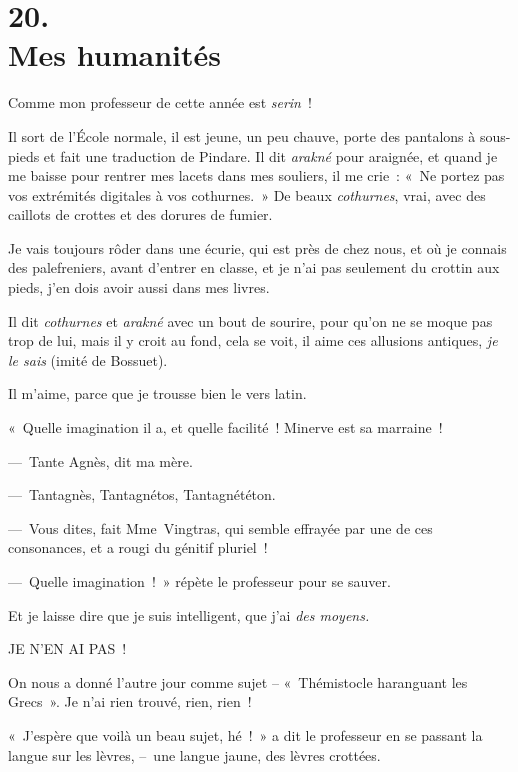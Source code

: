 \documentclass[french,twoside]{book} %
\begin{document}
\section[{20. Mes humanités}]{20. \\
Mes humanités}\renewcommand{\leftmark}{20. \\
Mes humanités}

\noindent Comme mon professeur de cette année est \emph{serin} !\par
Il sort de l’École normale, il est jeune, un peu chauve, porte des pantalons à sous-pieds et fait une traduction de Pindare. Il dit \emph{arakné} pour araignée, et quand je me baisse pour rentrer mes lacets dans mes souliers, il me crie : « Ne portez pas vos extrémités digitales à vos cothurnes. » De beaux \emph{cothurnes}, vrai, avec des caillots de crottes et des dorures de fumier.\par
Je vais toujours rôder dans une écurie, qui est près de chez nous, et où je connais des palefreniers, avant d’entrer en classe, et je n’ai pas seulement du crottin aux pieds, j’en dois avoir aussi dans mes livres.\par
Il dit \emph{cothurnes} et \emph{arakné} avec un bout de sourire, pour qu’on ne se moque pas trop de lui, mais il y croit au fond, cela se voit, il aime ces allusions antiques, \emph{je le sais} (imité de Bossuet).\par
\bigbreak
\noindent Il m’aime, parce que je trousse bien le vers latin.\par
« Quelle imagination il a, et quelle facilité ! Minerve est sa marraine !\par
— Tante Agnès, dit ma mère.\par
— Tantagnès, Tantagnétos, Tantagnététon.\par
— Vous dites, fait Mme Vingtras, qui semble effrayée par une de ces consonances, et a rougi du génitif pluriel !\par
— Quelle imagination ! » répète le professeur pour se sauver.\par
Et je laisse dire que je suis intelligent, que j’ai \emph{des moyens.}\par
JE N’EN AI PAS !\par
\bigbreak
\noindent On nous a donné l’autre jour comme sujet – « Thémistocle haranguant les Grecs ». Je n’ai rien trouvé, rien, rien !\par
« J’espère que voilà un beau sujet, hé ! » a dit le professeur en se passant la langue sur les lèvres, – une langue jaune, des lèvres crottées.\par
\end{document}
